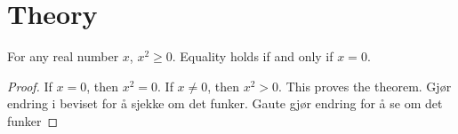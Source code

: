 \section{Theory}
\begin{thm}
    For any real number $x$, $x^2 \geq 0$. Equality holds if and only if $x=0$.
\end{thm}
\begin{proof}
    If $x=0$, then $x^2=0$. If $x\neq 0$, then $x^2 > 0$. This proves the theorem.
    Gjør endring i beviset for å sjekke om det funker.
    Gaute gjør endring for å se om det funker
\end{proof}